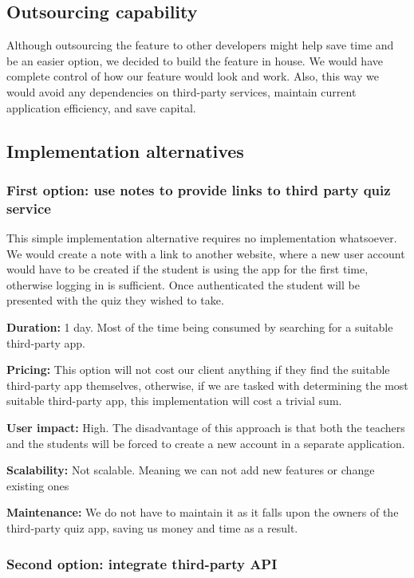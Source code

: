 \documentclass[
    english, %
]{VUMIFPSkursinis}
\begin{document}
\subsection{Outsourcing capability}

Although outsourcing the feature to other developers might help save time and be an easier option, we decided to build the feature in house. We would have complete control of how our feature would look and work. Also, this way we would avoid any dependencies on third-party services, maintain current application efficiency, and save capital.

\subsection{Implementation alternatives}

\subsubsection{First option: use notes to provide links to third party quiz service}

This simple implementation alternative requires no implementation whatsoever.  We would create a note with a link to another website, where a new user account would have to be created if the student is using the app for the first time, otherwise logging in is sufficient. Once authenticated the student will be presented with the quiz they wished to take.

\textbf{Duration:} 1 day. Most of the time being consumed by searching for a suitable third-party app.

\textbf{Pricing:} This option will not cost our client anything if they find the suitable third-party app themselves, otherwise, if we are tasked with determining the most suitable third-party app, this implementation will cost a trivial sum.

\textbf{User impact:} High. The disadvantage of this approach is that both the teachers and the students will be forced to create a new account in a separate application.

\textbf{Scalability:} Not scalable. Meaning we can not add new features or change existing ones

\textbf{Maintenance:} We do not have to maintain it as it falls upon the owners of the third-party quiz app, saving us money and time as a result.

\subsubsection{Second option: integrate third-party API}
\end{document}
